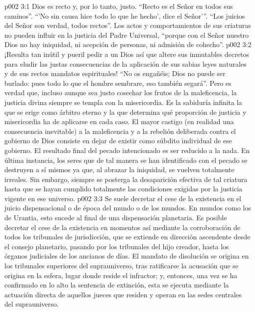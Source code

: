 \vs p002 3:1 Dios es recto y, por lo tanto, justo. “Recto es el Señor en todos sus caminos”. “'No sin causa hice todo lo que he hecho', dice el Señor'”. “Los juicios del Señor son verdad, todos rectos”. Los actos y comportamientos de sus criaturas no pueden influir en la justicia del Padre Universal, “porque con el Señor nuestro Dios no hay iniquidad, ni acepción de personas, ni admisión de cohecho”.
\vs p002 3:2 \pc ¡Resulta tan inútil y pueril pedir a un Dios así que altere sus inmutables decretos para eludir las justas consecuencias de la aplicación de sus sabias leyes naturales y de sus rectos mandatos espirituales! “No os engañéis; Dios no puede ser burlado: pues todo lo que el hombre sembrare, eso también segará”. Pero es verdad que, incluso aunque sea justo cosechar los frutos de la maleficencia, la justicia divina siempre se templa con la misericordia. Es la sabiduría infinita la que se erige como árbitro eterno y la que determina qué proporción de justicia y misericordia ha de aplicarse en cada caso. El mayor castigo (en realidad una consecuencia inevitable) a la maleficencia y a la rebelión deliberada contra el gobierno de Dios consiste en dejar de existir como súbdito individual de ese gobierno. El resultado final del pecado intencionado es ser reducido a la nada. En última instancia, los seres que de tal manera se han identificado con el pecado se destruyen a sí mismos ya que, al abrazar la iniquidad, se vuelven totalmente irreales. Sin embargo, siempre se posterga la desaparición efectiva de tal criatura hasta que se hayan cumplido totalmente las condiciones exigidas por la justicia vigente en ese universo.
\vs p002 3:3 Se suele decretar el cese de la existencia en el juicio dispensacional o de época del mundo o de los mundos. En mundos como los de Urantia, esto sucede al final de una dispensación planetaria. Es posible decretar el cese de la existencia en momentos así mediante la corroboración de todos los tribunales de jurisdicción, que se extiende en dirección ascendente desde el consejo planetario, pasando por los tribunales del hijo creador, hasta los órganos judiciales de los ancianos de días. El mandato de disolución se origina en los tribunales superiores del suprauniverso, tras ratificarse la acusación que se origina en la esfera, lugar donde reside el infractor; y, entonces, una vez se ha confirmado en lo alto la sentencia de extinción, esta se ejecuta mediante la actuación directa de aquellos jueces que residen y operan en las sedes centrales del suprauniverso.
